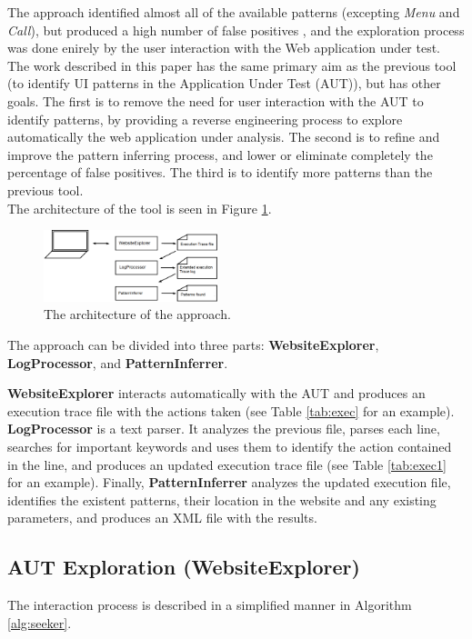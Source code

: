 \documentclass[conference]{IEEEtran}
\begin{document}
The approach identified almost all of the available patterns (excepting \textit{Menu }and \textit{Call}), but produced a high number of false positives \cite{nabuco2013inferring}, and the exploration process was done enirely by the user interaction with the Web application under test. \\

The work described in this paper has the same primary aim as the previous tool (to identify UI patterns in the Application Under Test (AUT)), but has other goals. The first is to remove the need for user interaction with the AUT to identify patterns, by providing a reverse engineering process to explore automatically the web application under analysis. The second is to refine and improve the pattern inferring process, and lower or eliminate completely the percentage of false positives. The third is to identify more patterns than the previous tool.\\

The architecture of the tool is seen in Figure \ref{fig:retool}.

\begin{figure}[!htb]
\centering
\includegraphics[width=0.45\textwidth]{retool}
\caption{The architecture of the approach.}
\label{fig:retool}
\end{figure}

The approach can be divided into three parts: \textbf{WebsiteExplorer}, \textbf{LogProcessor}, and \textbf{PatternInferrer}.

\textbf{WebsiteExplorer} interacts automatically with the AUT and produces an execution trace file with the actions taken (see Table \ref{tab:exec} for an example). \textbf{LogProcessor} is a text parser. It analyzes the previous file, parses each line, searches for important keywords and uses them to identify the action contained in the line, and produces an updated execution trace file (see Table \ref{tab:exec1} for an example). Finally, \textbf{PatternInferrer} analyzes the updated execution file, identifies the existent patterns, their location in the website and any existing parameters, and produces an XML file with the results.

\subsection{AUT Exploration (WebsiteExplorer)}\label{sec:inter}
The interaction process is described in a simplified manner in Algorithm \ref{alg:seeker}.
\end{document}
